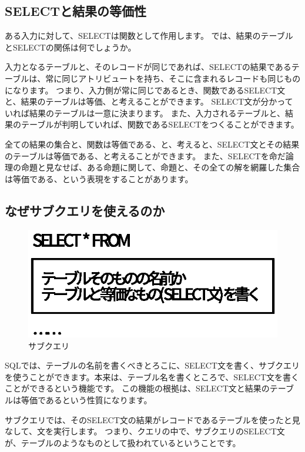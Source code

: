 \subsection{SELECTと結果の等価性}

ある入力に対して、SELECTは関数として作用します。
では、結果のテーブルとSELECTの関係は何でしょうか。

入力となるテーブルと、そのレコードが同じであれば、SELECTの結果であるテーブルは、常に同じアトリビュートを持ち、そこに含まれるレコードも同じものになります。
つまり、入力側が常に同じであるとき、関数であるSELECT文と、結果のテーブルは等価、と考えることができます。
SELECT文が分かっていれば結果のテーブルは一意に決まります。
また、入力されるテーブルと、結果のテーブルが判明していれば、関数であるSELECTをつくることができます。

全ての結果の集合と、関数は等価である、と、考えると、SELECT文とその結果のテーブルは等価である、と考えることができます。
また、SELECTを命だ論理の命題と見なせば、ある命題に関して、命題と、その全ての解を網羅した集合は等価である、という表現をすることがあります。

\subsection{なぜサブクエリを使えるのか}

\begin{figure}[htbp]
	\includegraphics[width=12cm,clip]{draw/subquery.eps}
	\caption{サブクエリ}
	\label{fig:subquery}
\end{figure}

SQLでは、テーブルの名前を書くべきとろこに、SELECT文を書く、サブクエリを使うことができます。本来は、テーブル名を書くところで、SELECT文を書くことができるという機能です。
この機能の根拠は、SELECT文と結果のテーブルは等価であるという性質になります。

サブクエリでは、そのSELECT文の結果がレコードであるテーブルを使ったと見なして、文を実行します。
つまり、クエリの中で、サブクエリのSELECT文が、テーブルのようなものとして扱われているということです。

